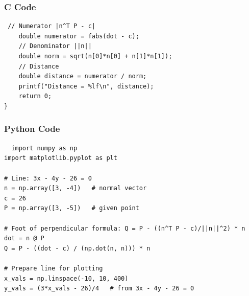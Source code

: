 \documentclass{beamer}
\begin{document}
\begin{frame}[fragile]
    \frametitle{C Code }
    \begin{lstlisting}
 // Numerator |n^T P - c|
    double numerator = fabs(dot - c);
    // Denominator ||n||
    double norm = sqrt(n[0]*n[0] + n[1]*n[1]);
    // Distance
    double distance = numerator / norm;
    printf("Distance = %lf\n", distance);
    return 0;
}

\end{lstlisting}
\end{frame}
\begin{frame}[fragile]
\frametitle{Python Code}
\begin{lstlisting}
  import numpy as np
import matplotlib.pyplot as plt

# Line: 3x - 4y - 26 = 0
n = np.array([3, -4])   # normal vector
c = 26
P = np.array([3, -5])   # given point

# Foot of perpendicular formula: Q = P - ((n^T P - c)/||n||^2) * n
dot = n @ P
Q = P - ((dot - c) / (np.dot(n, n))) * n

# Prepare line for plotting
x_vals = np.linspace(-10, 10, 400)
y_vals = (3*x_vals - 26)/4   # from 3x - 4y - 26 = 0
\end{lstlisting}
\end{frame}
\end{document}

